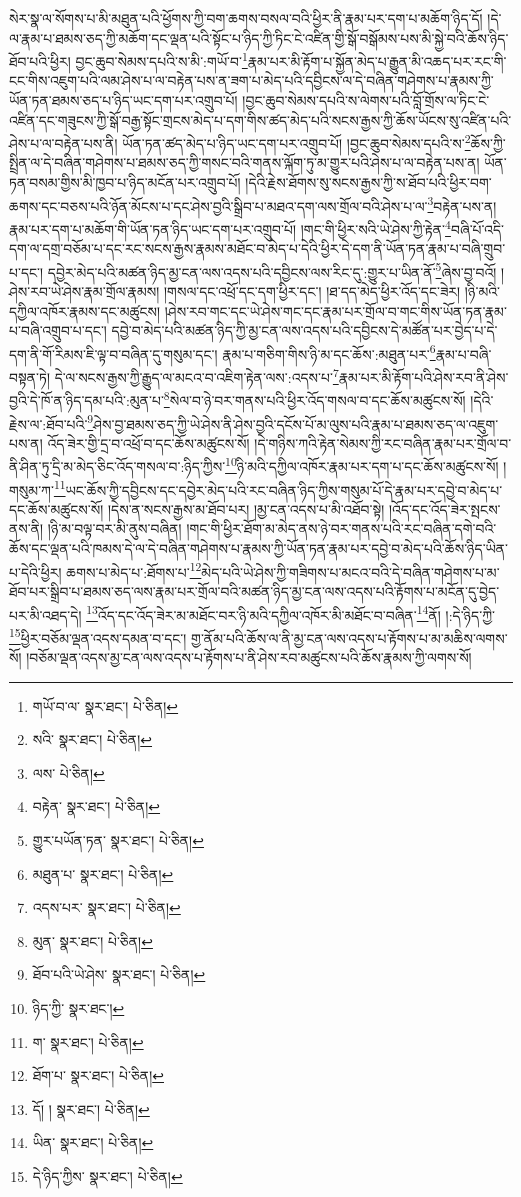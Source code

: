སེར་སྣ་ལ་སོགས་པ་མི་མཐུན་པའི་ཕྱོགས་ཀྱི་བག་ཆགས་བསལ་བའི་ཕྱིར་ནི་རྣམ་པར་དག་པ་མཆོག་ཉིད་དོ། །དེ་ལ་རྣམ་པ་ཐམས་ཅད་ཀྱི་མཆོག་དང་ལྡན་པའི་སྟོང་པ་ཉིད་ཀྱི་ཏིང་ངེ་འཛིན་གྱི་སྒོ་བསྒོམས་པས་མི་སྐྱེ་བའི་ཆོས་ཉིད་ཐོབ་པའི་ཕྱིར། བྱང་ཆུབ་སེམས་དཔའི་ས་མི་:གཡོ་བ་\footnote{གཡོ་བ་ལ་  སྣར་ཐང་།  པེ་ཅིན། }རྣམ་པར་མི་རྟོག་པ་སྐྱོན་མེད་པ་རྒྱུན་མི་འཆད་པར་རང་གི་ངང་གིས་འཇུག་པའི་ལམ་ཤེས་པ་ལ་བརྟེན་པས་ན་ཟག་པ་མེད་པའི་དབྱིངས་ལ་དེ་བཞིན་གཤེགས་པ་རྣམས་ཀྱི་ཡོན་ཏན་ཐམས་ཅད་པ་ཉིད་ཡང་དག་པར་འགྲུབ་པོ། །བྱང་ཆུབ་སེམས་དཔའི་ས་ལེགས་པའི་བློ་གྲོས་ལ་ཏིང་ངེ་འཛིན་དང་གཟུངས་ཀྱི་སྒོ་བརྒྱ་སྟོང་གྲངས་མེད་པ་དག་གིས་ཚད་མེད་པའི་སངས་རྒྱས་ཀྱི་ཆོས་ཡོངས་སུ་འཛིན་པའི་ཤེས་པ་ལ་བརྟེན་པས་ནི། ཡོན་ཏན་ཚད་མེད་པ་ཉིད་ཡང་དག་པར་འགྲུབ་པོ། །བྱང་ཆུབ་སེམས་དཔའི་ས་\footnote{སའི་  སྣར་ཐང་།  པེ་ཅིན། }ཆོས་ཀྱི་སྤྲིན་ལ་དེ་བཞིན་གཤེགས་པ་ཐམས་ཅད་ཀྱི་གསང་བའི་གནས་ལྐོག་ཏུ་མ་གྱུར་པའི་ཤེས་པ་ལ་བརྟེན་པས་ན། ཡོན་ཏན་བསམ་གྱིས་མི་ཁྱབ་པ་ཉིད་མངོན་པར་འགྲུབ་པོ། །དེའི་རྗེས་ཐོགས་སུ་སངས་རྒྱས་ཀྱི་ས་ཐོབ་པའི་ཕྱིར་བག་ཆགས་དང་བཅས་པའི་ཉོན་མོངས་པ་དང་ཤེས་བྱའི་སྒྲིབ་པ་མཐའ་དག་ལས་གྲོལ་བའི་ཤེས་པ་ལ་\footnote{ལས་  པེ་ཅིན། }བརྟེན་པས་ན། རྣམ་པར་དག་པ་མཆོག་གི་ཡོན་ཏན་ཉིད་ཡང་དག་པར་འགྲུབ་པོ། །གང་གི་ཕྱིར་སའི་ཡེ་ཤེས་ཀྱི་རྟེན་\footnote{བརྟེན་  སྣར་ཐང་།  པེ་ཅིན། }བཞི་པོ་འདི་དག་ལ་དགྲ་བཅོམ་པ་དང་རང་སངས་རྒྱས་རྣམས་མཐོང་བ་མེད་པ་དེའི་ཕྱིར་དེ་དག་ནི་ཡོན་ཏན་རྣམ་པ་བཞི་གྲུབ་པ་དང་། དབྱེར་མེད་པའི་མཚན་ཉིད་མྱ་ངན་ལས་འདས་པའི་དབྱིངས་ལས་རིང་དུ་:གྱུར་པ་ཡིན་ནོ་\footnote{གྱུར་པཡོན་ཏན་  སྣར་ཐང་།  པེ་ཅིན། }ཞེས་བྱ་བའོ། །ཤེས་རབ་ཡེ་ཤེས་རྣམ་གྲོལ་རྣམས། །གསལ་དང་འཕྲོ་དང་དག་ཕྱིར་དང་། །ཐ་དད་མེད་ཕྱིར་འོད་དང་ཟེར། །ཉི་མའི་དཀྱིལ་འཁོར་རྣམས་དང་མཚུངས། །ཤེས་རབ་གང་དང་ཡེ་ཤེས་གང་དང་རྣམ་པར་གྲོལ་བ་གང་གིས་ཡོན་ཏན་རྣམ་པ་བཞི་འགྲུབ་པ་དང་། དབྱེ་བ་མེད་པའི་མཚན་ཉིད་ཀྱི་མྱ་ངན་ལས་འདས་པའི་དབྱིངས་དེ་མཚོན་པར་བྱེད་པ་དེ་དག་ནི་གོ་རིམས་ཇི་ལྟ་བ་བཞིན་དུ་གསུམ་དང་། རྣམ་པ་གཅིག་གིས་ཉི་མ་དང་ཆོས་:མཐུན་པར་\footnote{མཐུན་པ་  སྣར་ཐང་།  པེ་ཅིན། }རྣམ་པ་བཞི་བསྟན་ཏེ། དེ་ལ་སངས་རྒྱས་ཀྱི་རྒྱུད་ལ་མངའ་བ་འཇིག་རྟེན་ལས་:འདས་པ་\footnote{འདས་པར་  སྣར་ཐང་།  པེ་ཅིན། }རྣམ་པར་མི་རྟོག་པའི་ཤེས་རབ་ནི་ཤེས་བྱའི་དེ་ཁོ་ན་ཉིད་དམ་པའི་:མུན་པ་\footnote{མུན་  སྣར་ཐང་།  པེ་ཅིན། }སེལ་བ་ཉེ་བར་གནས་པའི་ཕྱིར་འོད་གསལ་བ་དང་ཆོས་མཚུངས་སོ། །དེའི་རྗེས་ལ་:ཐོབ་པའི་\footnote{ཐོབ་པའི་ཡེ་ཤེས་  སྣར་ཐང་།  པེ་ཅིན། }ཤེས་བྱ་ཐམས་ཅད་ཀྱི་ཡེ་ཤེས་ནི་ཤེས་བྱའི་དངོས་པོ་མ་ལུས་པའི་རྣམ་པ་ཐམས་ཅད་ལ་འཇུག་པས་ན། འོད་ཟེར་གྱི་དྲ་བ་འཕྲོ་བ་དང་ཆོས་མཚུངས་སོ། །དེ་གཉིས་ཀའི་རྟེན་སེམས་ཀྱི་རང་བཞིན་རྣམ་པར་གྲོལ་བ་ནི་ཤིན་ཏུ་དྲི་མ་མེད་ཅིང་འོད་གསལ་བ་:ཉིད་ཀྱིས་\footnote{ཉིད་ཀྱི་  སྣར་ཐང་། }ཉི་མའི་དཀྱིལ་འཁོར་རྣམ་པར་དག་པ་དང་ཆོས་མཚུངས་སོ། །གསུམ་ཀ་\footnote{ག་  སྣར་ཐང་།  པེ་ཅིན། }ཡང་ཆོས་ཀྱི་དབྱིངས་དང་དབྱེར་མེད་པའི་རང་བཞིན་ཉིད་ཀྱིས་གསུམ་པོ་དེ་རྣམ་པར་དབྱེ་བ་མེད་པ་དང་ཆོས་མཚུངས་སོ། །དེས་ན་སངས་རྒྱས་མ་ཐོབ་པར། །མྱ་ངན་འདས་པ་མི་འཐོབ་སྟེ། །འོད་དང་འོད་ཟེར་སྤངས་ནས་ནི། །ཉི་མ་བལྟ་བར་མི་ནུས་བཞིན། །གང་གི་ཕྱིར་ཐོག་མ་མེད་ནས་ཉེ་བར་གནས་པའི་རང་བཞིན་དགེ་བའི་ཆོས་དང་ལྡན་པའི་ཁམས་དེ་ལ་དེ་བཞིན་གཤེགས་པ་རྣམས་ཀྱི་ཡོན་ཏན་རྣམ་པར་དབྱེ་བ་མེད་པའི་ཆོས་ཉིད་ཡིན་པ་དེའི་ཕྱིར། ཆགས་པ་མེད་པ་:ཐོགས་པ་\footnote{ཐོག་པ་  སྣར་ཐང་།  པེ་ཅིན། }མེད་པའི་ཡེ་ཤེས་ཀྱི་གཟིགས་པ་མངའ་བའི་དེ་བཞིན་གཤེགས་པ་མ་ཐོབ་པར་སྒྲིབ་པ་ཐམས་ཅད་ལས་རྣམ་པར་གྲོལ་བའི་མཚན་ཉིད་མྱ་ངན་ལས་འདས་པའི་རྟོགས་པ་མངོན་དུ་བྱེད་པར་མི་འཐད་དེ། \footnote{དོ། །   སྣར་ཐང་།  པེ་ཅིན། }འོད་དང་འོད་ཟེར་མ་མཐོང་བར་ཉི་མའི་དཀྱིལ་འཁོར་མི་མཐོང་བ་བཞིན་\footnote{ཡིན་  སྣར་ཐང་།  པེ་ཅིན། }ནོ། །:དེ་ཉིད་ཀྱི་\footnote{དེ་ཉིད་ཀྱིས་  སྣར་ཐང་།  པེ་ཅིན། }ཕྱིར་བཅོམ་ལྡན་འདས་དམན་བ་དང་། གྱ་ནོམ་པའི་ཆོས་ལ་ནི་མྱ་ངན་ལས་འདས་པ་རྟོགས་པ་མ་མཆིས་ལགས་སོ། །བཅོམ་ལྡན་འདས་མྱ་ངན་ལས་འདས་པ་རྟོགས་པ་ནི་ཤེས་རབ་མཚུངས་པའི་ཆོས་རྣམས་ཀྱི་ལགས་སོ། 